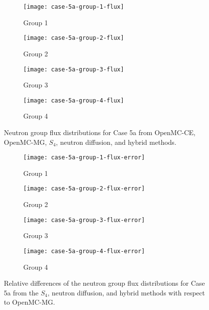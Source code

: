 \begin{figure}[htb!]
  \centering
  \begin{subfigure}[t]{.49\textwidth}
    \centering
    \texttt{[image: case-5a-group-1-flux]}
    \caption{Group 1}
    \label{fig:c5ag1}
  \end{subfigure}
  \hfill
  \begin{subfigure}[t]{.49\textwidth}
    \centering
    \texttt{[image: case-5a-group-2-flux]}
    \caption{Group 2}
    \label{fig:c5ag2}
  \end{subfigure}
  \hfill
  \begin{subfigure}[t]{.49\textwidth}
    \centering
    \texttt{[image: case-5a-group-3-flux]}
    \caption{Group 3}
    \label{fig:c5ag3}
  \end{subfigure}
  \hfill
  \begin{subfigure}[t]{.49\textwidth}
    \centering
    \texttt{[image: case-5a-group-4-flux]}
    \caption{Group 4}
    \label{fig:c5ag4}
  \end{subfigure}
  \caption{Neutron group flux distributions for Case 5a from OpenMC-CE, OpenMC-MG, $S_4$, neutron
  diffusion, and hybrid methods.}
  \label{fig:c5aflux}
\end{figure}
%
\begin{figure}[htb!]
  \centering
  \begin{subfigure}[t]{.49\textwidth}
    \centering
    \texttt{[image: case-5a-group-1-flux-error]}
    \caption{Group 1}
    \label{fig:c5ag1e}
  \end{subfigure}
  \hfill
  \begin{subfigure}[t]{.49\textwidth}
    \centering
    \texttt{[image: case-5a-group-2-flux-error]}
    \caption{Group 2}
    \label{fig:c5ag2e}
  \end{subfigure}
  \hfill
  \begin{subfigure}[t]{.49\textwidth}
    \centering
    \texttt{[image: case-5a-group-3-flux-error]}
    \caption{Group 3}
    \label{fig:c5ag3e}
  \end{subfigure}
  \hfill
  \begin{subfigure}[t]{.49\textwidth}
    \centering
    \texttt{[image: case-5a-group-4-flux-error]}
    \caption{Group 4}
    \label{fig:c5ag4e}
  \end{subfigure}
  \caption{Relative differences of the neutron group flux distributions for Case 5a from the $S_4$,
    neutron diffusion, and hybrid methods with respect to OpenMC-MG.}
  \label{fig:c5afluxe}
\end{figure}
